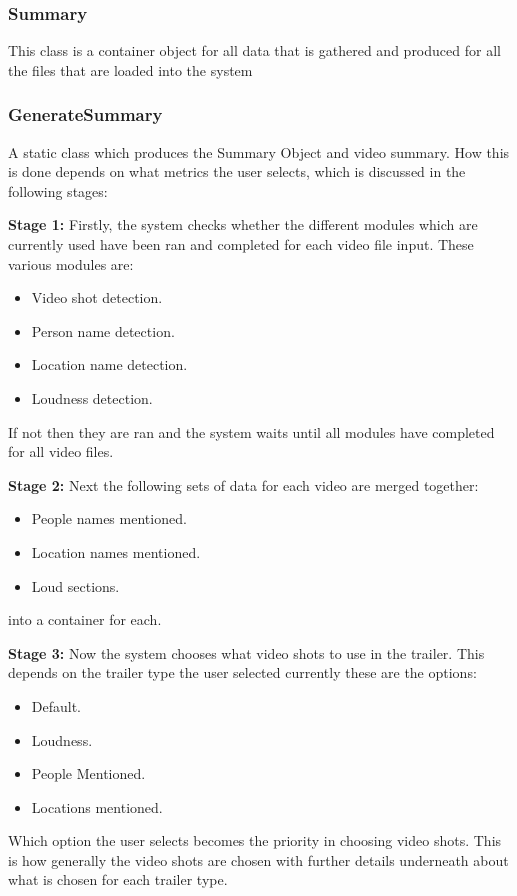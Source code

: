 \subsubsection{Summary}
This class is a container object for all data that is gathered and produced for all the files that are loaded into the system

\subsubsection{GenerateSummary}
A static class which produces the Summary Object and video summary. How this is done depends on what metrics the user selects, which is discussed in the following stages:

\textbf{Stage 1:} Firstly, the system checks whether the different modules which are currently used have been ran and completed for each video file input. These various modules are:
\begin{itemize}
	\item{Video shot detection.}
	\item{Person name detection.}
	\item{Location name detection.}
	\item{Loudness detection.}
\end{itemize}

If not then they are ran and the system waits until all modules have completed for all video files. 

\textbf{Stage 2:} Next the following sets of data for each video are merged together:
\begin{itemize}
	\item{People names mentioned.}
	\item{Location names mentioned.}
	\item{Loud sections.}
\end{itemize}
into a container for each.

\textbf{Stage 3:} Now the system chooses what video shots to use in the trailer. This depends on the trailer type the user selected currently these are the options:
\begin{itemize}
	\item{Default.}
	\item{Loudness.}
	\item{People Mentioned.}
	\item{Locations mentioned.}
\end{itemize}
Which option the user selects becomes the priority in choosing video shots. This is how generally the video shots are chosen with further details underneath about what is chosen for each trailer type.

